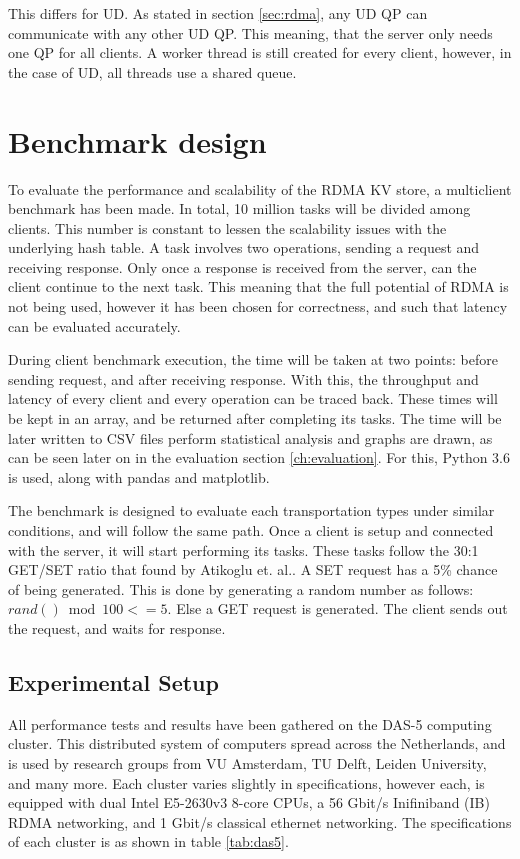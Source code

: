 This differs for UD.
As stated in section \ref{sec:rdma}, any UD QP can communicate with any other UD QP.
This meaning, that the server only needs one QP for all clients.
A worker thread is still created for every client, however, in the case of UD, all threads use a shared queue.



\section{Benchmark design}\label{sec:benchmark-design}
To evaluate the performance and scalability of the RDMA KV store, a multiclient benchmark has been made.
In total, 10 million tasks will be divided among clients.
This number is constant to lessen the scalability issues with the underlying hash table.
A task involves two operations, sending a request and receiving response.
Only once a response is received from the server, can the client continue to the next task.
This meaning that the full potential of RDMA is not being used, however it has been chosen for correctness, and such that latency can be evaluated accurately. %

During client benchmark execution, the time will be taken at two points: before sending request, and after receiving response.
With this, the throughput and latency of every client and every operation can be traced back.
These times will be kept in an array, and be returned after completing its tasks.
The time will be later written to CSV files perform statistical analysis and graphs are drawn, as can be seen later on in the evaluation section \ref{ch:evaluation}.
For this, Python 3.6\cite{python} is used, along with pandas\cite{pandas} and matplotlib\cite{matplotlib}.

The benchmark is designed to evaluate each transportation types under similar conditions, and will follow the same path.
Once a client is setup and connected with the server, it will start performing its tasks.
These tasks follow the 30:1 GET/SET ratio that found by Atikoglu et. al.\cite{atikoglu2012workload}.
A SET request has a 5\% chance of being generated.
This is done by generating a random number as follows: $rand() \bmod 100 <= 5$.
Else a GET request is generated.
The client sends out the request, and waits for response.

\subsection{Experimental Setup}\label{subsec:experimental-setup}
All performance tests and results have been gathered on the DAS-5 computing cluster\cite{das5}.
This distributed system of computers spread across the Netherlands, and is used by research groups from VU Amsterdam, TU Delft, Leiden University, and many more.
Each cluster varies slightly in specifications, however each, is equipped with dual Intel E5-2630v3 8-core CPUs, a 56 Gbit/s Inifiniband (IB) RDMA networking, and 1 Gbit/s classical ethernet networking.
The specifications of each cluster is as shown in table \ref{tab:das5}.


